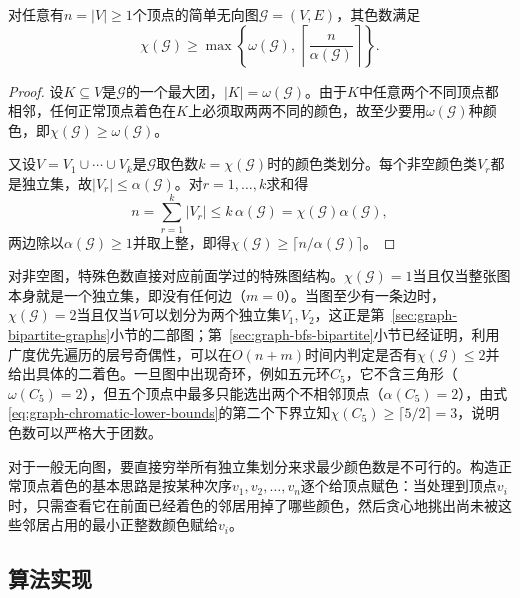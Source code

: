 \begin{lemma}[色数的团数与独立数下界]
\label{lem:graph-chromatic-lower-bounds}
对任意有$n=|V|\geq 1$个顶点的简单无向图$\mathcal G=(V,E)$，其色数满足
\begin{equation}
\chi(\mathcal G)\geq\max\left\{\omega(\mathcal G),\,\left\lceil\frac{n}{\alpha(\mathcal G)}\right\rceil\right\}.
\label{eq:graph-chromatic-lower-bounds}
\end{equation}
\end{lemma}

\begin{proof}
设$K\subseteq V$是$\mathcal G$的一个最大团，$|K|=\omega(\mathcal G)$。由于$K$中任意两个不同顶点都相邻，任何正常顶点着色在$K$上必须取两两不同的颜色，故至少要用$\omega(\mathcal G)$种颜色，即$\chi(\mathcal G)\geq\omega(\mathcal G)$。

又设$V=V_1\cup\cdots\cup V_k$是$\mathcal G$取色数$k=\chi(\mathcal G)$时的颜色类划分。每个非空颜色类$V_r$都是独立集，故$|V_r|\leq\alpha(\mathcal G)$。对$r=1,\ldots,k$求和得
\[
n=\sum_{r=1}^{k}|V_r|\leq k\,\alpha(\mathcal G)=\chi(\mathcal G)\alpha(\mathcal G),
\]
两边除以$\alpha(\mathcal G)\geq 1$并取上整，即得$\chi(\mathcal G)\geq\lceil n/\alpha(\mathcal G)\rceil$。
\end{proof}

对非空图，特殊色数直接对应前面学过的特殊图结构。$\chi(\mathcal G)=1$当且仅当整张图本身就是一个独立集，即没有任何边（$m=0$）。当图至少有一条边时，$\chi(\mathcal G)=2$当且仅当$V$可以划分为两个独立集$V_1,V_2$，这正是第~\ref{sec:graph-bipartite-graphs}小节的二部图；第~\ref{sec:graph-bfs-bipartite}小节已经证明，利用广度优先遍历的层号奇偶性，可以在$O(n+m)$时间内判定是否有$\chi(\mathcal G)\leq 2$并给出具体的二着色。一旦图中出现奇环，例如五元环$C_5$，它不含三角形（$\omega(C_5)=2$），但五个顶点中最多只能选出两个不相邻顶点（$\alpha(C_5)=2$），由式\eqref{eq:graph-chromatic-lower-bounds}的第二个下界立知$\chi(C_5)\geq\lceil 5/2\rceil=3$，说明色数可以严格大于团数。

对于一般无向图，要直接穷举所有独立集划分来求最少颜色数是不可行的。构造正常顶点着色的基本思路是按某种次序$v_1,v_2,\ldots,v_n$逐个给顶点赋色：当处理到顶点$v_i$时，只需查看它在前面已经着色的邻居用掉了哪些颜色，然后贪心地挑出尚未被这些邻居占用的最小正整数颜色赋给$v_i$。

\subsection{算法实现}
\label{sec:graph-coloring-algorithm}

